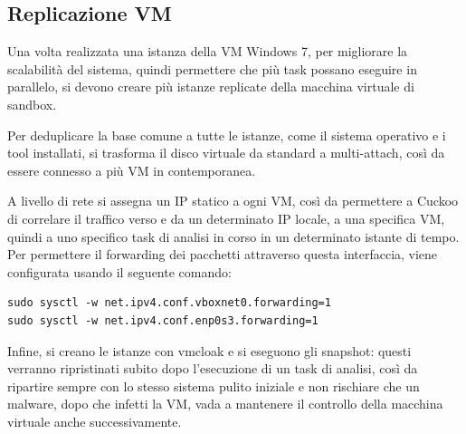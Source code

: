 \subsection{Replicazione VM}
\label{chap:dynamic-vm-replication}
Una volta realizzata una istanza della VM Windows 7, per migliorare la scalabilità del sistema,
quindi permettere che più task possano eseguire in parallelo, 
si devono creare più istanze replicate della macchina virtuale di sandbox.

Per deduplicare la base comune a tutte le istanze, come il sistema operativo e i tool installati, si trasforma il disco virtuale da standard a multi-attach, così da essere connesso a più VM in contemporanea.

A livello di rete si assegna un IP statico a ogni VM, così da permettere a Cuckoo di correlare il traffico verso e da un determinato IP locale, a una specifica VM, quindi a uno specifico task di analisi in corso in un determinato istante di tempo.
Per permettere il forwarding dei pacchetti attraverso questa interfaccia, viene configurata usando il seguente comando:
\begin{verbatim}
sudo sysctl -w net.ipv4.conf.vboxnet0.forwarding=1
sudo sysctl -w net.ipv4.conf.enp0s3.forwarding=1
\end{verbatim}

Infine, si creano le istanze con vmcloak e si eseguono gli snapshot: questi verranno ripristinati subito dopo l'esecuzione di un task di analisi, così da ripartire sempre con lo stesso sistema pulito iniziale e non rischiare che un malware, dopo che infetti la VM, vada a mantenere il controllo della macchina virtuale anche successivamente.

